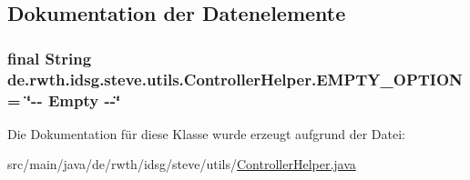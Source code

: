 \subsection{Dokumentation der Datenelemente}
\hypertarget{classde_1_1rwth_1_1idsg_1_1steve_1_1utils_1_1_controller_helper_a109b68c4123f4c253f29673721e3382b}{
\subsubsection[{E\-M\-P\-T\-Y\-\_\-\-O\-P\-T\-I\-O\-N}]{\setlength{\rightskip}{0pt plus 5cm}final String de.\-rwth.\-idsg.\-steve.\-utils.\-Controller\-Helper.\-E\-M\-P\-T\-Y\-\_\-\-O\-P\-T\-I\-O\-N = \char`\"{}-\/-\/ Empty -\/-\/\char`\"{}\hspace{0.3cm}{\ttfamily [static]}}}\label{classde_1_1rwth_1_1idsg_1_1steve_1_1utils_1_1_controller_helper_a109b68c4123f4c253f29673721e3382b}


Die Dokumentation für diese Klasse wurde erzeugt aufgrund der Datei\-:\begin{DoxyCompactItemize}
\item 
src/main/java/de/rwth/idsg/steve/utils/\hyperlink{_controller_helper_8java}{Controller\-Helper.\-java}\end{DoxyCompactItemize}
